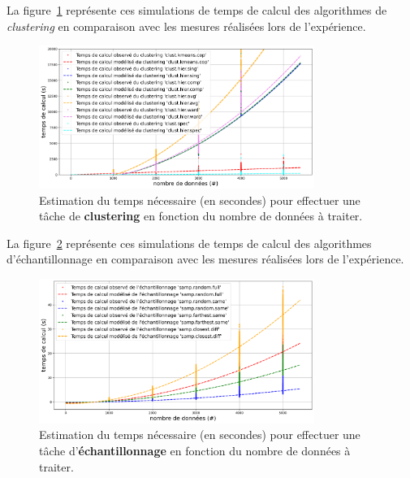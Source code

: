 			La figure~\ref{figure:4.3.1-ETUDE-COUTS-TEMPS-CALCUL-MODELISATION-CLUSTERING} représente ces simulations de temps de calcul des algorithmes de \textit{clustering} en comparaison avec les mesures réalisées lors de l'expérience.
			\newline
			\begin{figure}[!htb]
				\centering
				\includegraphics[width=0.8\textwidth]{figures/etude-temps-calcul-modelisation-3clust}
				\caption{Estimation du temps nécessaire (en secondes) pour effectuer une tâche de \textbf{clustering} en fonction du nombre de données à traiter.}
				\label{figure:4.3.1-ETUDE-COUTS-TEMPS-CALCUL-MODELISATION-CLUSTERING}
			\end{figure}
			
			
			
			La figure~\ref{figure:4.3.1-ETUDE-COUTS-TEMPS-CALCUL-MODELISATION-SAMPLING} représente ces simulations de temps de calcul des algorithmes d'échantillonnage en comparaison avec les mesures réalisées lors de l'expérience.
			\newline
			\begin{figure}[!htb]
				\centering
				\includegraphics[width=0.8\textwidth]{figures/etude-temps-calcul-modelisation-4samp}
				\caption{Estimation du temps nécessaire (en secondes) pour effectuer une tâche d'\textbf{échantillonnage} en fonction du nombre de données à traiter.}
				\label{figure:4.3.1-ETUDE-COUTS-TEMPS-CALCUL-MODELISATION-SAMPLING}
			\end{figure}

